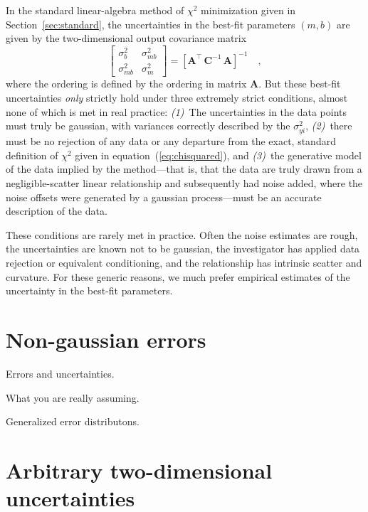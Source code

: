 \documentclass[12pt]{article}
\newcommand{\sectionname}{Section}
\newcommand{\equationname}{equation}
\newcommand{\mmatrix}[1]{\boldsymbol{#1}}
\newcommand{\inverse}[1]{{#1}^{-1}}
\newcommand{\transpose}[1]{{#1}^{\scriptscriptstyle \top}}
\newcommand{\mA}{\mmatrix{A}}
\newcommand{\mAT}{\transpose{\mA}}
\newcommand{\mC}{\mmatrix{C}}
\newcommand{\mCinv}{\inverse{\mC}}
\begin{document}
In the standard linear-algebra method of $\chi^2$ minimization given
in \sectionname~\ref{sec:standard}, the uncertainties in the best-fit
parameters $(m,b)$ are given by the two-dimensional output covariance
matrix
\begin{equation}
\left[\begin{array}{cc}
\sigma_{b}^2 & \sigma_{mb}^2 \\
\sigma_{mb}^2 & \sigma_{m}^2
\end{array}\right] = \inverse{\left[\mAT\,\mCinv\,\mA\right]} \quad ,
\end{equation}
where the ordering is defined by the ordering in matrix $\mA$.  But
these best-fit uncertainties \emph{only} strictly hold under three
extremely strict conditions, almost none of which is met in real
practice: \textsl{(1)}~The uncertainties in the data points must truly
be gaussian, with variances correctly described by the
$\sigma_{yi}^2$, \textsl{(2)}~there must be no rejection of any data
or any departure from the exact, standard definition of $\chi^2$ given
in \equationname~(\ref{eq:chisquared}), and \textsl{(3)}~the
generative model of the data implied by the method---that is, that the
data are truly drawn from a negligible-scatter linear relationship and
subsequently had noise added, where the noise offsets were generated
by a gaussian process---must be an accurate description of the data.

These conditions are rarely met in practice.  Often the noise
estimates are rough, the uncertainties are known not to be gaussian,
the investigator has applied data rejection or equivalent
conditioning, and the relationship has intrinsic scatter and
curvature.  For these generic reasons, we much prefer empirical
estimates of the uncertainty in the best-fit parameters.


\section{Non-gaussian errors}

Errors and uncertainties.

What you are really assuming.

Generalized error distributons.

\section{Arbitrary two-dimensional uncertainties}
\end{document}
